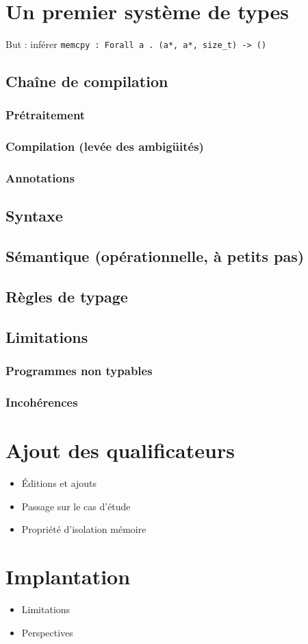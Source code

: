 \documentclass{phdthesis}
\begin{document}
\chapter{Un premier système de types}

But : inférer
\texttt{memcpy : Forall a . (a*, a*, size\_t) -\textgreater{} ()}

\section{Chaîne de compilation}
\subsection{Prétraitement}
\subsection{Compilation (levée des ambigüités)}
\subsection{Annotations}
\section{Syntaxe}
\section{Sémantique (opérationnelle, à petits pas)}
\section{Règles de typage}
\section{Limitations}
\subsection{Programmes non typables}
\subsection{Incohérences}

\chapter{Ajout des qualificateurs}

\begin{itemize}
  \item Éditions et ajouts
  \item Passage sur le cas d'étude
  \item Propriété d'isolation mémoire
\end{itemize}

\chapter{Implantation}


\begin{itemize}
  \item Limitations
  \item Perspectives
\end{itemize}

%
%
\end{document}
